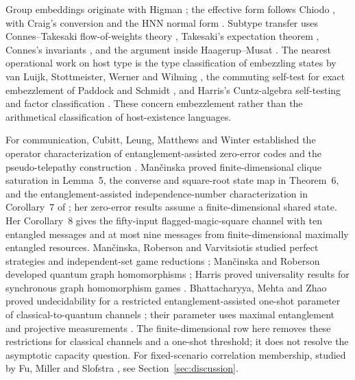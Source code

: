 Group embeddings originate with Higman \cite{Higman}; the effective form follows Chiodo \cite[Theorem 2.2]{Chiodo}, with Craig's conversion \cite{Craig} and the HNN normal form \cite{HNN}. Subtype transfer uses Connes--Takesaki flow-of-weights theory \cite{ConnesTakesaki}, Takesaki's expectation theorem \cite{Takesaki}, Connes's invariants \cite{Connes}, and the argument inside Haagerup--Musat \cite[Lemma 3.8]{HM}. The nearest operational work on host type is the type classification of embezzling states by van Luijk, Stottmeister, Werner and Wilming \cite{VLSWW}, the commuting self-test for exact embezzlement of Paddock and Schmidt \cite{PS}, and Harris's Cuntz-algebra self-testing and factor classification \cite{HarrisEmbezzlement}. These concern embezzlement rather than the arithmetical classification of host-existence languages.

For communication, Cubitt, Leung, Matthews and Winter established the operator characterization of entanglement-assisted zero-error codes and the pseudo-telepathy construction \cite{CLMW}. Man\v{c}inska proved finite-dimensional clique saturation in Lemma~5, the converse and square-root state map in Theorem~6, and the entanglement-assisted independence-number characterization in Corollary~7 of \cite{Mancinska}; her zero-error results assume a finite-dimensional shared state. Her Corollary~8 gives the fifty-input flagged-magic-square channel with ten entangled messages and at most nine messages from finite-dimensional maximally entangled resources. Man\v{c}inska, Roberson and Varvitsiotis studied perfect strategies and independent-set game reductions \cite{MRV}; Man\v{c}inska and Roberson developed quantum graph homomorphisms \cite{MR}; Harris proved universality results for synchronous graph homomorphism games \cite{HarrisGraph}. Bhattacharyya, Mehta and Zhao proved undecidability for a restricted entanglement-assisted one-shot parameter of classical-to-quantum channels \cite{BMZ}; their parameter uses maximal entanglement and projective measurements \cite[Definition~2.3]{BMZ}. The finite-dimensional row here removes these restrictions for classical channels and a one-shot threshold; it does not resolve the asymptotic capacity question. For fixed-scenario correlation membership, studied by Fu, Miller and Slofstra \cite{FMS}, see Section~\ref{sec:discussion}.

\precursordisclosure

